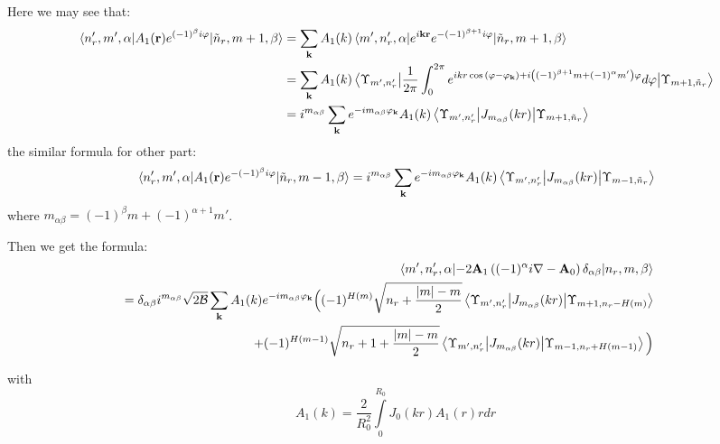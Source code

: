 \documentclass[a4paper,article,14pt]{extarticle}
\begin{document}
\noindent Here we may see that: 
\begin{equation}
	\begin{aligned}
 \mel{n_r',m',\alpha} { A_{1} (\mathbf{r}) e^{ (-1)^\beta i \varphi}} {\tilde{n}_r, m +1,\beta} &=  \sum\limits_{\mathbf{k} }  A_{1} (k)  \mel{m', n_r',\alpha} {  e^{i \mathbf{k}\mathbf{r}} e^{ -(-1)^{\beta+1} i \varphi} } {\tilde{n}_r, m +1,\beta} \\
  &=  \sum\limits_{\mathbf{k} }  A_{1} (k)  \mel{\Upsilon_{m', n'_r}} {\frac{1}{2 \pi}\int _{0}^{ 2 \pi } e^{i k r \cos{\left( \varphi - \varphi_{\mathbf{k}}  \right)} + i \left((-1)^{\beta+1}m + (-1)^{\alpha} m'  \right)  \varphi}   d\varphi} {\Upsilon_{m +1, \tilde{n}_r}} \\
   &=  i^{m_{\alpha \beta}} \sum\limits_{\mathbf{k} } e^{-im_{\alpha \beta}\varphi_{\mathbf{k}}}   A_{1} (k)  \mel{\Upsilon_{m', n'_r}} {J_{m_{\alpha \beta}} (kr)} {\Upsilon_{m +1, \tilde{n}_r}}
 \end{aligned}
\end{equation}
\noindent the similar formula for other part:
\begin{equation}
 \mel{n_r',m',\alpha} { A_{1} (\mathbf{r}) e^{ -(-1)^\beta i \varphi}} {\tilde{n}_r, m -1,\beta} =   i^{m_{\alpha \beta}} \sum\limits_{\mathbf{k} } e^{- i m_{\alpha \beta} \varphi_{\mathbf{k}}}   A_{1} (k)  \mel{\Upsilon_{m', n'_r}} {J_{m_{\alpha \beta}} (kr)} {\Upsilon_{m -1, \tilde{n}_r}}
\end{equation}
\noindent where $ m_{\alpha \beta} = (-1)^{\beta}m + (-1)^{\alpha+1} m' $.

\noindent Then we get the formula:
\begin{equation}
\begin{aligned}
\mel{m', n'_r, \alpha} { - 2 \mathbf{A}_1 \left( (-1)^{\alpha} i \nabla - \mathbf{A}_0 \right) \delta_{\alpha \beta}} {n_r, m, \beta} \\
= \delta_{\alpha \beta} i^{m_{\alpha \beta} }  \sqrt{ {2\cal{B}} } \sum\limits_{\mathbf{k} }  A_{1} (k) e^{- i m_{\alpha \beta}\varphi_{\mathbf{k}}} \Big(  (-1)^{H(m)} \sqrt{  n_r + \frac{|m| - m}{2}  }   \mel{\Upsilon_{m', n'_r}} {J_{m_{\alpha \beta}} (kr)} {\Upsilon_{m +1, n_r-H(m)}}  & \\
  + (-1)^{H(m-1)} \sqrt{n_r + 1 + \frac{|m| - m}{2}  }   \mel{\Upsilon_{m', n'_r}} {J_{m_{\alpha \beta}} (kr)} {\Upsilon_{m-1, n_r+H(m-1)}} 
\Big)
\end{aligned}
\end{equation}

with 
\begin{equation}
A_{1} (k) = \frac{2}{R_0^2}  \int\limits_{0}^{R_0}  J_{0} (k r ) A_1(r) r dr 
\end{equation} 
\end{document}
